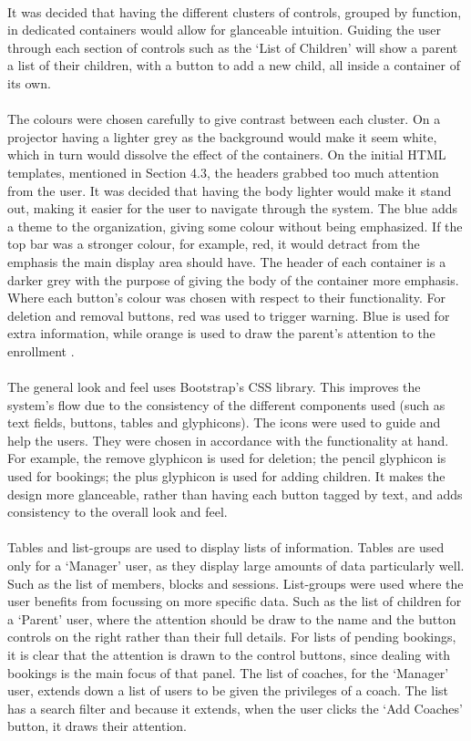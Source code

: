 \documentclass{l3proj}
\begin{document}
\\ It was decided that having the different clusters of controls, grouped by function, in dedicated containers would allow for glanceable intuition. Guiding the user through each section of controls such as the `List of Children' will show a parent a list of their children, with a button to add a new child, all inside a container of its own.\\
\\The colours were chosen carefully to give contrast between each cluster. On a projector having a lighter grey as the background would make it seem white, which in turn would dissolve the effect of the containers. On the initial HTML templates, mentioned in Section 4.3, the headers grabbed too much attention from the user. It was decided that having the body lighter would make it stand out, making it easier for the user to navigate through the system. The blue adds a theme to the organization, giving some colour without being emphasized. If the top bar was a stronger colour,  for example, red, it would detract from the emphasis the main display area should have. The header of each container is a darker grey with the purpose of giving the body of the container more emphasis. Where each button's colour was chosen with respect to their functionality. For deletion and removal buttons, red was used to trigger warning. Blue is used for extra information, while orange is used to draw the parent's attention to the enrollment \cite{UID}. \\
\\The general look and feel uses Bootstrap's CSS library. This improves the system's flow due to the consistency of the different components used (such as text fields, buttons, tables and glyphicons). The icons were used to guide and help the users. They were chosen in accordance with the functionality at hand. For example, the remove glyphicon is used for deletion; the pencil glyphicon is used for bookings; the plus glyphicon is used for adding children. It makes the design more glanceable, rather than having each button tagged by text, and adds consistency to the overall look and feel.\\
\\Tables and list-groups are used to display lists of information. Tables are used only for a `Manager' user, as they display large amounts of data particularly well. Such as the list of members, blocks and sessions. List-groups were used where the user benefits from focussing on more specific data. Such as the list of children for a `Parent' user, where the attention should be draw to the name and the button controls on the right rather than their full details. For lists of pending bookings, it is clear that the attention is drawn to the control buttons, since dealing with bookings is the main focus of that panel. The list of coaches, for the `Manager' user, extends down a list of users to be given the privileges of a coach. The list has a search filter and because it extends, when the user clicks the `Add Coaches' button, it draws their attention.
\end{document}
